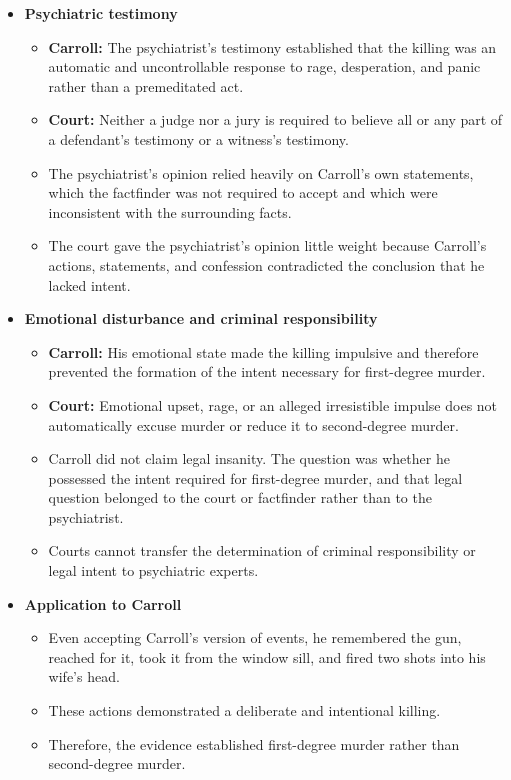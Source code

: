 \documentclass[11pt]{tex/lawoutline}
\begin{document}
{\begin{itemize}
            \item \textbf{Psychiatric testimony}
            \begin{itemize}
                \item \textbf{Carroll:} The psychiatrist's testimony established that the killing was an automatic and uncontrollable response to rage, desperation, and panic rather than a premeditated act.
                \item \textbf{Court:} Neither a judge nor a jury is required to believe all or any part of a defendant's testimony or a witness's testimony.
                \item The psychiatrist's opinion relied heavily on Carroll's own statements, which the factfinder was not required to accept and which were inconsistent with the surrounding facts.
                \item The court gave the psychiatrist's opinion little weight because Carroll's actions, statements, and confession contradicted the conclusion that he lacked intent.
            \end{itemize}

            \item \textbf{Emotional disturbance and criminal responsibility}
            \begin{itemize}
                \item \textbf{Carroll:} His emotional state made the killing impulsive and therefore prevented the formation of the intent necessary for first-degree murder.
                \item \textbf{Court:} Emotional upset, rage, or an alleged irresistible impulse does not automatically excuse murder or reduce it to second-degree murder.
                \item Carroll did not claim legal insanity. The question was whether he possessed the intent required for first-degree murder, and that legal question belonged to the court or factfinder rather than to the psychiatrist.
                \item Courts cannot transfer the determination of criminal responsibility or legal intent to psychiatric experts.
            \end{itemize}

            \item \textbf{Application to Carroll}
            \begin{itemize}
                \item Even accepting Carroll's version of events, he remembered the gun, reached for it, took it from the window sill, and fired two shots into his wife's head.
                \item These actions demonstrated a deliberate and intentional killing.
                \item Therefore, the evidence established first-degree murder rather than second-degree murder.
            \end{itemize}
        \end{itemize}
    }
\end{document}
